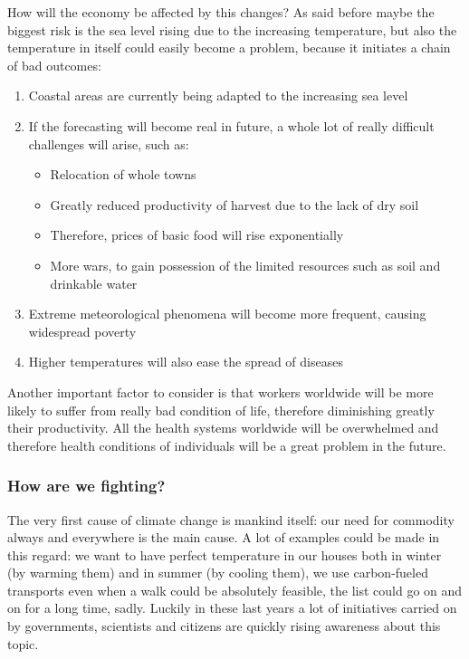 \documentclass[11pt,a4paper,titlepage]{book}
\begin{document}
\newline
How will the economy be affected by this changes?
\newline
As said before maybe the biggest risk is the sea level rising due to the increasing temperature, but also the temperature in itself could easily become a problem, because it initiates a chain of bad outcomes:
\begin{enumerate}
    \item Coastal areas are currently being adapted to the increasing sea level
    \item If the forecasting will become real in future, a whole lot of really difficult challenges will arise, such as:
        \begin{itemize}
            \item Relocation of whole towns
            \item Greatly reduced productivity of harvest due to the lack of dry soil
            \item Therefore, prices of basic food will rise exponentially
            \item More wars, to gain possession of the limited resources such as soil and drinkable water
        \end{itemize}
    \item Extreme meteorological phenomena will become more frequent, causing widespread poverty
    \item Higher temperatures will also ease the spread of diseases
\end{enumerate}
Another important factor to consider is that workers worldwide will be more likely to suffer from really bad condition of life, therefore diminishing greatly their productivity. All the health systems worldwide will be overwhelmed and therefore health conditions of individuals will be a great problem in the future.

\subsubsection{How are we fighting?}
The very first cause of climate change is mankind itself: our need for commodity always and everywhere is the main cause. A lot of examples could be made in this regard: we want to have perfect temperature in our houses both in winter (by warming them) and in summer (by cooling them), we use carbon-fueled transports even when a walk could be absolutely feasible, the list could go on and on for a long time, sadly.
\newline
\newline
Luckily in these last years a lot of initiatives carried on by governments, scientists and citizens are quickly rising awareness about this topic.
\end{document}
